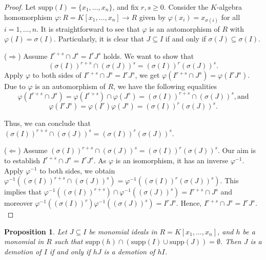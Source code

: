 \documentclass[11pt]{amsart}
\newtheorem{proposition}[theorem]{Proposition}
\begin{document}
\begin{proof}
  Let  $\mathrm{supp}(I)=\{x_1, \ldots, x_n\}$, and fix $r,s\geq 0$.  Consider the $K$-algebra homomorphism $\varphi : R=K[x_1, \ldots, x_n] \rightarrow R$  given by $\varphi(x_i)=x_{\sigma(i)}$ for all $i=1, \ldots, n$.  It is straightforward to see that  $\varphi$ is an automorphism of $R$ with  $\varphi(I)=\sigma(I)$. Particularly, it is clear that $J\subseteq I$ if and only if $\sigma(J) \subseteq \sigma(I)$. 
  
(\(\Rightarrow\))
Assume \(I^{r+s} \cap J^s = I^r J^s\) holds. We want to show that 
\[
(\sigma(I))^{r+s} \cap (\sigma(J))^s = (\sigma(I))^r (\sigma(J))^s.
\]
Apply \(\varphi\) to both sides of \(I^{r+s} \cap J^s = I^r J^s\), we get $\varphi(I^{r+s} \cap J^s) = \varphi(I^r J^s).$ 
 Due to  \(\varphi\) is an automorphism of $R$, we have the following equalities 
         \[
        \varphi(I^{r+s} \cap J^s) = \varphi(I^{r+s}) \cap \varphi(J^s) = (\sigma(I))^{r+s} \cap (\sigma(J))^s, \text{and}
        \]
        \[
        \varphi(I^r J^s) = \varphi(I^r) \varphi(J^s) = (\sigma(I))^r (\sigma(J))^s.
        \]

Thus, we can conclude that $(\sigma(I))^{r+s} \cap (\sigma(J))^s = (\sigma(I))^r (\sigma(J))^s.$ 

(\(\Leftarrow\))  Assume $(\sigma(I))^{r+s} \cap (\sigma(J))^s = (\sigma(I))^r (\sigma(J))^s.$ Our aim is to establish \(I^{r+s} \cap J^s = I^r J^s\).  
As \(\varphi\) is an isomorphism, it has an inverse \(\varphi^{-1}\). Apply \(\varphi^{-1}\) to both sides, we obtain 
$\varphi^{-1}\left((\sigma(I))^{r+s} \cap (\sigma(J))^s\right) = \varphi^{-1}\left((\sigma(I))^r (\sigma(J))^s\right).$
This implies that  $\varphi^{-1}((\sigma(I))^{r+s}) \cap \varphi^{-1}((\sigma(J))^s) = I^{r+s} \cap J^s$ and moreover
    $\varphi^{-1}((\sigma(I))^r) \varphi^{-1}((\sigma(J))^s) = I^r J^s.$ Hence, $I^{r+s} \cap J^s = I^r J^s.$
\end{proof}




\begin{proposition}\label{Multiple}
Let  $J \subseteq I$ be monomial ideals in  $R=K[x_1, \ldots, x_n]$, and   $h$ be a monomial in $R$ such that 
$\mathrm{supp}(h) \cap (\mathrm{supp}(I) \cup \mathrm{supp}(J))=\emptyset$. 
 Then  $J$ is a demotion of $I$ if and only if   $hJ$  is a demotion of   $hI$. 
  \end{proposition}
  
\end{document}
